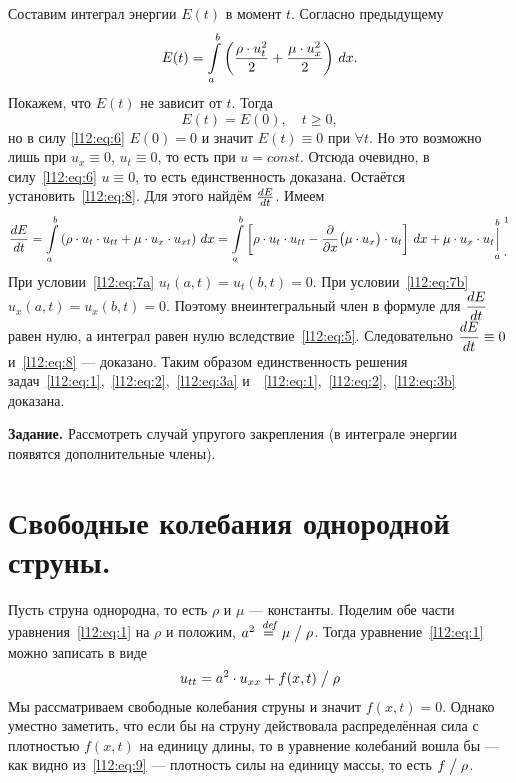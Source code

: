 Составим интеграл энергии $E(t)$ в момент $t$. Согласно предыдущему 
\begin{equation*}
	\hfill E(t)=\int\limits_a^b\left(\frac{\rho\cdot u^2_t}{2}+\frac{\mu\cdot u^2_x}{2}\right)\,dx.\hfill
\end{equation*} 
Покажем, что $E(t)$ не зависит от $t$. Тогда 
\begin{equation}
	\label{l12:eq:8}
	E(t)=E(0),\quad t\geqslant0,
\end{equation}
но в силу \eqref{l12:eq:6} $E(0)=0$ и значит $E(t)\equiv0$ при $\forall t$. Но это возможно лишь при $u_x\equiv0$, $u_t\equiv0$, то есть при $u=const$. Отсюда очевидно, в силу~\eqref{l12:eq:6} $u\equiv0$, то есть единственность доказана. Остаётся установить~\eqref{l12:eq:8}. Для этого найдём $\frac{dE}{dt}$. Имеем 
\begin{equation*}
	\der{E}{t}=\int\limits_a^b\left(\rho\cdot u_t\cdot u_{tt}+\mu\cdot u_x\cdot u_{xt}\right)\,dx=\int\limits_a^b\left[\rho\cdot u_t\cdot u_{tt}-\pder{}{x}\big(\mu\cdot u_x\big)\cdot u_t\right]\,dx+\mu\cdot u_x\cdot u_t{\mathop{\Big|}\limits_a^b}\phantom{|}{\vphantom{\bigg|}}^{\footnotemark{}}_{\displaystyle.}
\end{equation*}
При условии~\eqref{l12:eq:7a} $u_t(a,t)=u_t(b,t)=0$. При условии~\eqref{l12:eq:7b} $u_x(a,t)=u_x(b,t)=0$. Поэтому внеинтегральный член в формуле для $\displaystyle\frac{dE}{dt}$ равен нулю, а интеграл равен нулю вследствие~\eqref{l12:eq:5}. Следовательно $\displaystyle\frac{dE}{dt}\equiv0$ и~\eqref{l12:eq:8} --- доказано. Таким образом единственность решения задач~\eqref{l12:eq:1},~\eqref{l12:eq:2},~\eqref{l12:eq:3a} и~~\eqref{l12:eq:1},~\eqref{l12:eq:2},~\eqref{l12:eq:3b} доказана.
\vspace{0.2cm}

\noindent\textbf{Задание. }Рассмотреть случай упругого закрепления (в интеграле энергии появятся дополнительные члены).

\section{Свободные колебания однородной струны.}
\label{lecture11section2}
Пусть струна однородна, то есть $\rho$ и $\mu$ --- константы. Поделим обе части уравнения~\eqref{l12:eq:1} на $\rho$ и положим, $a^2\stackrel{\hspace{0.09 cm}de\!f}{=}{\mu}\bigm/{\rho}$. Тогда уравнение~\eqref{l12:eq:1} можно записать в виде
\begin{equation}
	\label{l12:eq:9}
	\hfill u_{tt}=a^2\cdot u_{xx}+f(x,t)\bigm/\rho\hfill
\end{equation}
Мы рассматриваем свободные колебания струны и значит $f(x,t)=0$. Однако уместно заметить, что если бы на струну действовала распределённая сила с плотностью $f(x,t)$ на единицу длины, то в уравнение колебаний вошла бы --- как видно из~\eqref{l12:eq:9} --- плотность силы на единицу массы, то есть $f\bigm/\rho$.

